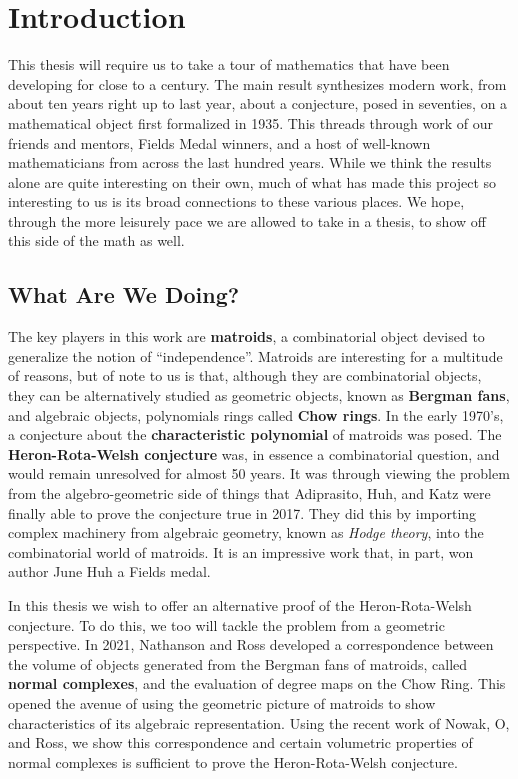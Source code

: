 \documentclass[12pt,oneside]{../../sfsuthesis}
\begin{document}
\chapter{Introduction}


This thesis will require us to take a tour of mathematics that have been developing for close to a century.
The main result synthesizes modern work, from about ten years right up to last year, about a conjecture, posed in seventies, on a mathematical object first formalized in 1935.
This threads through work of our friends and mentors, Fields Medal winners, and a host of well-known mathematicians from across the last hundred years.
While we think the results alone are quite interesting on their own, much of what has made this project so interesting to us is its broad connections to these various places.
We hope, through the more leisurely pace we are allowed to take in a thesis, to show off this side of the math as well.

\section{What Are We Doing?}

The key players in this work are \textbf{matroids}, a combinatorial object devised to generalize the notion of ``independence''.
Matroids are interesting for a multitude of reasons, but of note to us is that, although they are combinatorial objects, they can be alternatively studied as geometric objects, known as \textbf{Bergman fans}, and algebraic objects, polynomials rings called \textbf{Chow rings}.
In the early 1970's, a conjecture about the \textbf{characteristic polynomial} of matroids was posed.
The \textbf{Heron-Rota-Welsh conjecture} was, in essence a combinatorial question, and would remain unresolved for almost 50 years.
It was through viewing the problem from the algebro-geometric side of things that Adiprasito, Huh, and Katz were finally able to prove the conjecture true in 2017.
They did this by importing complex machinery from algebraic geometry, known as \emph{Hodge theory}, into the combinatorial world of matroids.
It is an impressive work that, in part, won author June Huh a Fields medal.

In this thesis we wish to offer an alternative proof of the Heron-Rota-Welsh conjecture.
To do this, we too will tackle the problem from a geometric perspective.
In 2021, Nathanson and Ross developed a correspondence between the volume of objects generated from the Bergman fans of matroids, called \textbf{normal complexes}, and the evaluation of degree maps on the Chow Ring.
This opened the avenue of using the geometric picture of matroids to show characteristics of its algebraic representation.
Using the recent work of Nowak, O, and Ross, we show this correspondence and certain volumetric properties of normal complexes is sufficient to prove the Heron-Rota-Welsh conjecture.
\end{document}
